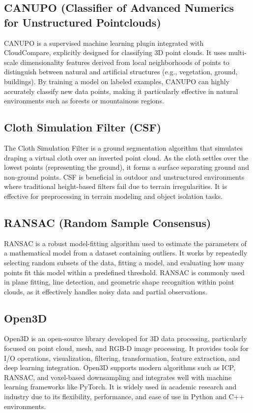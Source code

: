 \documentclass[../report.tex]{subfiles}
\begin{document}
\subsection{CANUPO (Classifier of Advanced Numerics for Unstructured Pointclouds)}

CANUPO is a supervised machine learning plugin integrated with CloudCompare, explicitly designed for classifying 3D point clouds. It uses multi-scale dimensionality features derived from local neighborhoods of points to distinguish between natural and artificial structures (e.g., vegetation, ground, buildings). By training a model on labeled examples, CANUPO can highly accurately classify new data points, making it particularly effective in natural environments such as forests or mountainous regions.

\subsection{Cloth Simulation Filter (CSF)}

The Cloth Simulation Filter\cite{ClothSF} is a ground segmentation algorithm that simulates draping a virtual cloth over an inverted point cloud. As the cloth settles over the lowest points (representing the ground), it forms a surface separating ground and non-ground points. CSF is beneficial in outdoor and unstructured environments where traditional height-based filters fail due to terrain irregularities. It is effective for preprocessing in terrain modeling and object isolation tasks.

\subsection{RANSAC (Random Sample Consensus)}

RANSAC is a robust model-fitting algorithm used to estimate the parameters of a mathematical model from a dataset containing outliers\cite{RANSAC}. It works by repeatedly selecting random subsets of the data, fitting a model, and evaluating how many points fit this model within a predefined threshold. RANSAC is commonly used in plane fitting, line detection, and geometric shape recognition within point clouds, as it effectively handles noisy data and partial observations.

\subsection{Open3D}

Open3D is an open-source library developed for 3D data processing, particularly focused on point cloud, mesh, and RGB-D image processing. It provides tools for I/O operations, visualization, filtering, transformation, feature extraction, and deep learning integration. Open3D supports modern algorithms such as ICP, RANSAC, and voxel-based downsampling and integrates well with machine learning frameworks like PyTorch. It is widely used in academic research and industry due to its flexibility, performance, and ease of use in Python and C++ environments.

\end{document}

